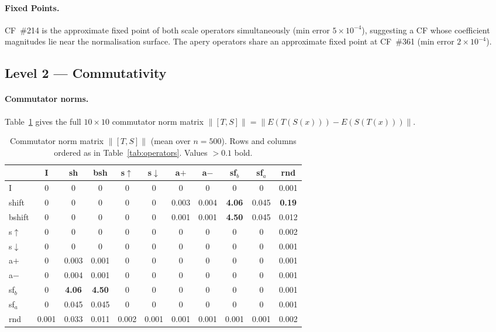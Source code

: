\documentclass[11pt,a4paper]{article}
\begin{document}
\paragraph{Fixed Points.}
CF~\#214 is the approximate fixed point of both scale operators simultaneously
(min error $5\times10^{-4}$), suggesting a CF whose coefficient magnitudes lie
near the normalisation surface.  The apery operators share an approximate fixed
point at CF~\#361 (min error $2\times10^{-4}$).

\subsection{Level 2 --- Commutativity}
\label{sec:level2}

\paragraph{Commutator norms.}
Table~\ref{tab:commutator} gives the full $10\times10$ commutator norm matrix
$\|[T,S]\| = \|E(T(S(x))) - E(S(T(x)))\|$.

\begin{table}[h]
\centering
\caption{Commutator norm matrix $\|[T,S]\|$ (mean over $n=500$). Rows and
columns ordered as in Table~\ref{tab:operators}. Values $>0.1$ bold.}
\label{tab:commutator}
\footnotesize
\setlength{\tabcolsep}{4pt}
\begin{tabular}{l|cccccccccc}
\toprule
 & I & sh & bsh & s$\uparrow$ & s$\downarrow$ & a$+$ & a$-$ & sf$_b$ & sf$_a$ & rnd \\
\midrule
I        & 0    & 0    & 0    & 0    & 0    & 0    & 0    & 0    & 0    & 0.001 \\
shift    & 0    & 0    & 0    & 0    & 0    & 0.003 & 0.004 & \textbf{4.06} & 0.045 & \textbf{0.19} \\
bshift   & 0    & 0    & 0    & 0    & 0    & 0.001 & 0.001 & \textbf{4.50} & 0.045 & 0.012 \\
s$\uparrow$ & 0 & 0    & 0    & 0    & 0    & 0    & 0    & 0    & 0    & 0.002 \\
s$\downarrow$ & 0 & 0  & 0    & 0    & 0    & 0    & 0    & 0    & 0    & 0.001 \\
a$+$     & 0    & 0.003 & 0.001 & 0  & 0    & 0    & 0    & 0    & 0    & 0.001 \\
a$-$     & 0    & 0.004 & 0.001 & 0  & 0    & 0    & 0    & 0    & 0    & 0.001 \\
sf$_b$   & 0    & \textbf{4.06} & \textbf{4.50} & 0 & 0 & 0 & 0 & 0 & 0 & 0.001 \\
sf$_a$   & 0    & 0.045 & 0.045 & 0  & 0    & 0    & 0    & 0    & 0    & 0.001 \\
rnd      & 0.001 & 0.033 & 0.011 & 0.002 & 0.001 & 0.001 & 0.001 & 0.001 & 0.001 & 0.002 \\
\bottomrule
\end{tabular}
\end{table}
\end{document}
